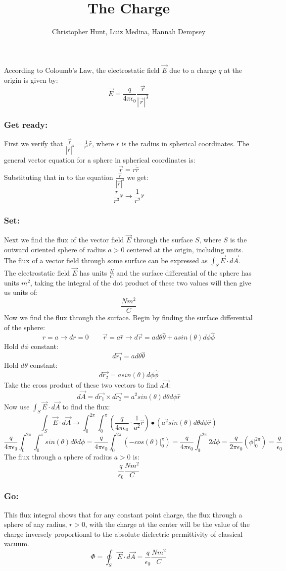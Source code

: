 \documentclass[11pt]{article}
\title{The Charge}
\author{Christopher Hunt, Luiz Medina, Hannah Dempsey}
\date{}
\begin{document}
\pagestyle{fancy}
\fancyhf{}
\rhead{\thepage}
\maketitle
According to Coloumb's Law, the electrostatic field $\vec{E}$ due to a charge $q$ at the origin is given by:
$$\vec{E} = \frac{q}{4\pi\epsilon_0}\frac{\vec{r}}{|\vec{r}|^3}$$
\subsubsection*{Get ready:}
First we verify that $\frac{\vec{r}}{|\vec{r}|^3} = \frac{1}{r^2}\hat{r}$, where $r$ is the radius in spherical coordinates. The general vector equation for a sphere in spherical coordinates is:
$$\vec{r} = r \dot \hat{r}$$
Substituting that in to the equation $\frac{\vec{r}}{|\vec{r}|^3}$ we get:
$$\frac{r}{r^3}\hat{r} \rightarrow \frac{1}{r^2}\hat{r}$$
\subsubsection*{Set:}

Next we find the flux of the vector field $\vec{E}$ through the surface $S$, where $S$ is the outward oriented sphere of radius $a > 0$ centered at the origin, including units. The flux of a vector field through some surface can be expressed as $\int_S \vec{E}\cdot d\vec{A}$. The electrostatic field $\vec{E}$ has units $\frac{N}{C}$ and the surface differential of the sphere has units $m^2$, taking the integral of the dot product of these two values will then give us units of:
$$\frac{N m^2}{C}$$
Now we find the flux through the surface. Begin by finding the surface differential of the sphere:
$$r = a \rightarrow dr = 0\qquad \vec{r} = a\hat{r} \rightarrow d\vec{r} = ad\theta \hat{\theta} + asin(\theta)d\phi\hat{\phi}$$
Hold $d\phi$ constant:
$$d\vec{r_1} = ad\theta\hat{\theta}$$
Hold $d\theta$ constant:
$$d\vec{r_2} = asin(\theta)d\phi\hat{\phi}$$
Take the cross product of these two vectors to find $d\vec{A}$:
$$d\vec{A} = d\vec{r_1}\times d\vec{r_2} = a^2sin(\theta)d\theta d\phi \hat{r}$$
Now use $\int_S \vec{E}\cdot d\vec{A}$ to find the flux:
$$\int_S \vec{E}\cdot d\vec{A} \rightarrow \int_0^{2\pi}\int_0^{\pi} \left(\frac{q}{4\pi\epsilon_0}\cdot \frac{1}{a^2}\hat{r} \right)\bullet \left(a^2sin(\theta)d\theta d\phi \hat{r} \right)$$
$$\frac{q}{4\pi\epsilon_0}\int_0^{2\pi}\int_0^{\pi}sin(\theta)d\theta d\phi = \frac{q}{4\pi\epsilon_0}\int_0^{2\pi}( -cos(\theta)|_0^{\pi}) = \frac{q}{4\pi\epsilon_0}\int_0^{2\pi}2 d\phi = \frac{q}{2\pi\epsilon_0}(\phi |_0^{2\pi})= \frac{q}{\epsilon_0}$$
The flux through a sphere of radius $a > 0$ is:
$$\frac{q}{\epsilon_0}\frac{N m^2}{C}$$
\subsubsection*{Go:}
This flux integral shows that for any constant point charge, the flux through a sphere of any radius, $r > 0$, with the charge at the center will be the value of the charge inversely proportional to the absolute dielectric permittivity of classical vacuum.
$$\Phi = \oint_S \vec{E} \cdot d\vec{A} = \frac{q}{\epsilon_0}\frac{N m^2}{C}$$
\end{document}
